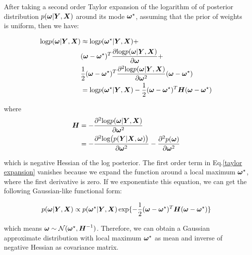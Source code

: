 After taking a second order Taylor expansion of the logarithm of of posterior distribution $p(\boldsymbol \omega | \boldsymbol Y, \boldsymbol X)$ around its mode $\boldsymbol \omega^\star$, assuming that the prior of weights is uniform, then we have:

\begin{equation}
\begin{aligned} \label{taylor expansion}
\text{log} p(\boldsymbol \omega| \boldsymbol Y, \boldsymbol X) &\approx 
\text{log}p(\boldsymbol \omega^\star|\boldsymbol Y, \boldsymbol X) + \\
&(\boldsymbol \omega - \boldsymbol \omega^\star)^T\frac{\partial \text{log} p(\boldsymbol \omega| \boldsymbol Y, \boldsymbol X)}{\partial \boldsymbol \omega} + \\
&\frac{1}{2}(\boldsymbol \omega - \boldsymbol \omega^\star)^T\frac{\partial^2\text{log} p(\boldsymbol \omega |\boldsymbol Y, \boldsymbol X)}{\partial \boldsymbol \omega^2}(\boldsymbol \omega - \boldsymbol \omega^\star)\\
&= \text{log}p(\boldsymbol \omega^\star|\boldsymbol Y, \boldsymbol X) - \frac{1}{2}(\boldsymbol \omega - \boldsymbol \omega^\star)^T\boldsymbol H(\boldsymbol \omega - \boldsymbol \omega^\star)
\end{aligned}
\end{equation}


where 
\[
\begin{aligned}
\boldsymbol H &= -\frac{\partial^2\text{log} p(\boldsymbol \omega|\boldsymbol Y, \boldsymbol X)}{\partial \boldsymbol \omega^2}\\
&=-\frac{\partial^2\text{log}\big(p(\boldsymbol Y|\boldsymbol X, \boldsymbol \omega)\big)}{\partial \boldsymbol \omega^2} - \frac{\partial^2p(\boldsymbol \omega)}{\partial\boldsymbol \omega^2}
\end{aligned}
\]

which is negative Hessian of the log posterior. The first order term in Eq.\ref{taylor expansion} vanishes because we expand the function around a local maximum $\boldsymbol \omega^\star$, where the first derivative is zero. If we exponentiate this equation, we can get the following Gaussian-like functional form: 

\begin{equation}
\begin{aligned}\label{gaussian form}
p(\boldsymbol \omega | \boldsymbol Y, \boldsymbol X) \propto p(\boldsymbol \omega^\star|\boldsymbol Y, \boldsymbol X)\exp\{-\frac{1}{2}(\boldsymbol \omega - \boldsymbol \omega^\star)^T\boldsymbol H (\boldsymbol \omega - \boldsymbol \omega^\star)\}
\end{aligned}
\end{equation}

which means $\boldsymbol \omega \sim \mathcal N(\boldsymbol \omega^\star, \boldsymbol H ^{-1})$. Therefore, we can obtain a Gaussian approximate distribution with local maximum $\boldsymbol \omega^\star$ as mean and inverse of negative Hessian as covariance matrix.

